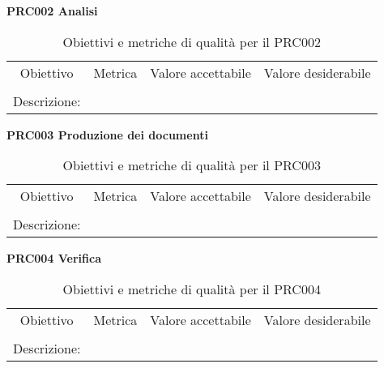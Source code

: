 \documentclass[../piano-di-qualifica.tex]{subfiles}
\begin{document}
    \begin{center}
        \centering
        \textbf{PRC002 Analisi}
    \end{center}
        \begin{table}[H]
            \centering
            \begin{tabular}{cccc}
            Obiettivo    & Metrica & Valore accettabile & Valore desiderabile \\
                         &         &                    &                    \\
            Descrizione: & \multicolumn{3}{c}{}        
            \end{tabular}
            \caption{Obiettivi e metriche di qualità per il PRC002}
        \end{table}

        \begin{center}
            \centering
            \textbf{PRC003 Produzione dei documenti}
        \end{center}
            \begin{table}[H]
                \centering
                \begin{tabular}{cccc}
                Obiettivo    & Metrica & Valore accettabile & Valore desiderabile \\
                             &         &                    &                    \\
                Descrizione: & \multicolumn{3}{c}{}        
                \end{tabular}
                \caption{Obiettivi e metriche di qualità per il PRC003}
            \end{table}

        \begin{center}
            \centering
            \textbf{PRC004 Verifica}
        \end{center}
            \begin{table}[H]
                \centering
                \begin{tabular}{cccc}
                Obiettivo    & Metrica & Valore accettabile & Valore desiderabile \\
                             &         &                    &                    \\
                Descrizione: & \multicolumn{3}{c}{}        
                \end{tabular}
                \caption{Obiettivi e metriche di qualità per il PRC004}
            \end{table}
\end{document}
